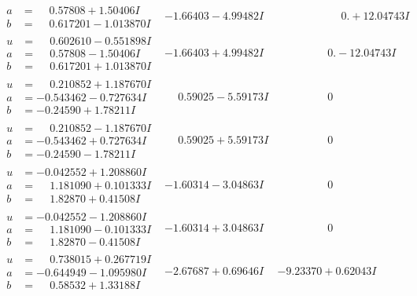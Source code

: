 \documentclass[1p]{elsarticle_modified}
\theoremstyle{definition}
\begin{document}
$$\begin{array}{c|c|c}
\begin{aligned}
a &= \phantom{-}0.57808 + 1.50406 I \\
b &= \phantom{-}0.617201 - 1.013870 I\end{aligned}
 & -1.66403 - 4.99482 I & \phantom{-0.000000 -}0. + 12.04743 I \\ \hline\begin{aligned}
u &= \phantom{-}0.602610 - 0.551898 I \\
a &= \phantom{-}0.57808 - 1.50406 I \\
b &= \phantom{-}0.617201 + 1.013870 I\end{aligned}
 & -1.66403 + 4.99482 I & \phantom{-0.000000 } 0. - 12.04743 I \\ \hline\begin{aligned}
u &= \phantom{-}0.210852 + 1.187670 I \\
a &= -0.543462 - 0.727634 I \\
b &= -0.24590 + 1.78211 I\end{aligned}
 & \phantom{-}0.59025 - 5.59173 I & \phantom{-0.000000 } 0 \\ \hline\begin{aligned}
u &= \phantom{-}0.210852 - 1.187670 I \\
a &= -0.543462 + 0.727634 I \\
b &= -0.24590 - 1.78211 I\end{aligned}
 & \phantom{-}0.59025 + 5.59173 I & \phantom{-0.000000 } 0 \\ \hline\begin{aligned}
u &= -0.042552 + 1.208860 I \\
a &= \phantom{-}1.181090 + 0.101333 I \\
b &= \phantom{-}1.82870 + 0.41508 I\end{aligned}
 & -1.60314 - 3.04863 I & \phantom{-0.000000 } 0 \\ \hline\begin{aligned}
u &= -0.042552 - 1.208860 I \\
a &= \phantom{-}1.181090 - 0.101333 I \\
b &= \phantom{-}1.82870 - 0.41508 I\end{aligned}
 & -1.60314 + 3.04863 I & \phantom{-0.000000 } 0 \\ \hline\begin{aligned}
u &= \phantom{-}0.738015 + 0.267719 I \\
a &= -0.644949 - 1.095980 I \\
b &= \phantom{-}0.58532 + 1.33188 I\end{aligned}
 & -2.67687 + 0.69646 I & -9.23370 + 0.62043 I \\ \hline\begin{aligned}

\end{aligned}
\end{array}$$
\end{document}

